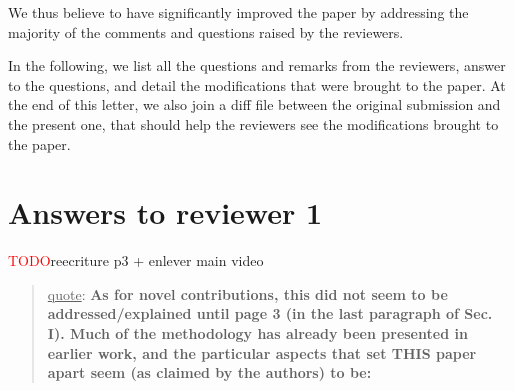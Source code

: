 \documentclass[a4paper]{article}
\newcommand{\ndone}[0]{\textcolor{red}{TODO}}
\newcommand\quot[1]{\begin{quote} \underline{quote}: \textbf{#1}\end{quote}}
\begin{document}
We thus believe to have significantly improved the paper by addressing the majority of the comments and questions raised by the reviewers.

\bigskip

In the following, we list all the questions and remarks from the reviewers, answer to the questions, and detail the modifications that were brought to the paper.
At the end of this letter, we also join a diff file between the original submission and the present one, that should help the reviewers see the modifications 
brought to the paper.


\section{Answers to reviewer 1}
\ndone reecriture p3 + enlever main video

\quot {As for novel contributions, this did not seem to be addressed/explained
until page 3 (in the last paragraph of Sec. I). Much of the methodology
has already been presented in earlier work, and the particular aspects
that set THIS paper apart seem (as claimed by the authors) to be: 
}
\end{document}
